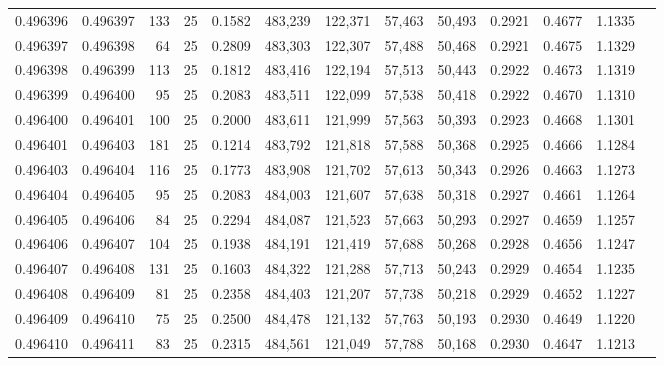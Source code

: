 \begin{tabular}{rrrrrrrrrrrrr}
0.496396 & 0.496397 &   133 &  25 &                                     0.1582 & 483,239 & 122,371 &  57,463 &  50,493 & 0.2921 & 0.4677 & 1.1335 \\
0.496397 & 0.496398 &    64 &  25 &                                     0.2809 & 483,303 & 122,307 &  57,488 &  50,468 & 0.2921 & 0.4675 & 1.1329 \\
0.496398 & 0.496399 &   113 &  25 &                                     0.1812 & 483,416 & 122,194 &  57,513 &  50,443 & 0.2922 & 0.4673 & 1.1319 \\
0.496399 & 0.496400 &    95 &  25 &                                     0.2083 & 483,511 & 122,099 &  57,538 &  50,418 & 0.2922 & 0.4670 & 1.1310 \\
0.496400 & 0.496401 &   100 &  25 &                                     0.2000 & 483,611 & 121,999 &  57,563 &  50,393 & 0.2923 & 0.4668 & 1.1301 \\
0.496401 & 0.496403 &   181 &  25 &                                     0.1214 & 483,792 & 121,818 &  57,588 &  50,368 & 0.2925 & 0.4666 & 1.1284 \\
0.496403 & 0.496404 &   116 &  25 &                                     0.1773 & 483,908 & 121,702 &  57,613 &  50,343 & 0.2926 & 0.4663 & 1.1273 \\
0.496404 & 0.496405 &    95 &  25 &                                     0.2083 & 484,003 & 121,607 &  57,638 &  50,318 & 0.2927 & 0.4661 & 1.1264 \\
0.496405 & 0.496406 &    84 &  25 &                                     0.2294 & 484,087 & 121,523 &  57,663 &  50,293 & 0.2927 & 0.4659 & 1.1257 \\
0.496406 & 0.496407 &   104 &  25 &                                     0.1938 & 484,191 & 121,419 &  57,688 &  50,268 & 0.2928 & 0.4656 & 1.1247 \\
0.496407 & 0.496408 &   131 &  25 &                                     0.1603 & 484,322 & 121,288 &  57,713 &  50,243 & 0.2929 & 0.4654 & 1.1235 \\
0.496408 & 0.496409 &    81 &  25 &                                     0.2358 & 484,403 & 121,207 &  57,738 &  50,218 & 0.2929 & 0.4652 & 1.1227 \\
0.496409 & 0.496410 &    75 &  25 &                                     0.2500 & 484,478 & 121,132 &  57,763 &  50,193 & 0.2930 & 0.4649 & 1.1220 \\
0.496410 & 0.496411 &    83 &  25 &                                     0.2315 & 484,561 & 121,049 &  57,788 &  50,168 & 0.2930 & 0.4647 & 1.1213 \\

\end{tabular}
